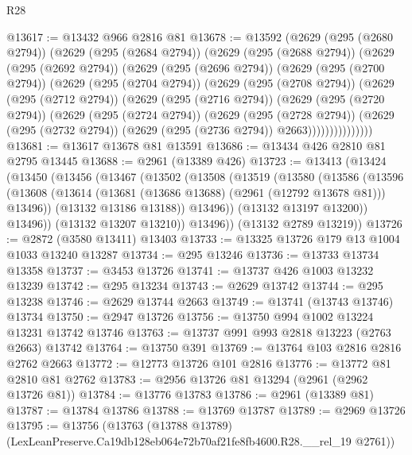 \begin{lexlean}{R28}
\begin{coremodule}
@13617 := @13432 @966 @2816 @81
@13678 := @13592
    (@2629
      (@295 (@2680 @2794))
      (@2629
        (@295 (@2684 @2794))
        (@2629
          (@295 (@2688 @2794))
          (@2629
            (@295 (@2692 @2794))
            (@2629
              (@295 (@2696 @2794))
              (@2629
                (@295 (@2700 @2794))
                (@2629
                  (@295 (@2704 @2794))
                  (@2629
                    (@295 (@2708 @2794))
                    (@2629
                      (@295 (@2712 @2794))
                      (@2629
                        (@295 (@2716 @2794))
                        (@2629
                          (@295 (@2720 @2794))
                          (@2629
                            (@295 (@2724 @2794))
                            (@2629
                              (@295 (@2728 @2794))
                              (@2629
                                (@295 (@2732 @2794))
                                (@2629 (@295 (@2736 @2794)) @2663)))))))))))))))
@13681 := @13617 @13678 @81 @13591
@13686 := @13434 @426 @2810 @81 @2795 @13445
@13688 := @2961 (@13389 @426)
@13723 := @13413
    (@13424
      (@13450
        (@13456
          (@13467
            (@13502
              (@13508
                (@13519
                  (@13580
                    (@13586
                      (@13596
                        (@13608
                          (@13614 (@13681 (@13686 @13688) (@2961 (@12792 @13678 @81))) @13496))
                        (@13132 @13186 @13188))
                      @13496))
                  (@13132 @13197 @13200))
                @13496))
            (@13132 @13207 @13210))
          @13496))
      (@13132 @2789 @13219))
@13726 := @2872 (@3580 @13411) @13403
@13733 := @13325 @13726 @179 @13 @1004 @1033 @13240 @13287
@13734 := @295 @13246
@13736 := @13733 @13734 @13358
@13737 := @3453 @13726
@13741 := @13737 @426 @1003 @13232 @13239
@13742 := @295 @13234
@13743 := @2629 @13742
@13744 := @295 @13238
@13746 := @2629 @13744 @2663
@13749 := @13741 (@13743 @13746) @13734
@13750 := @2947 @13726
@13756 := @13750 @994 @1002 @13224 @13231 @13742 @13746
@13763 := @13737 @991 @993 @2818 @13223 (@2763 @2663) @13742
@13764 := @13750 @391
@13769 := @13764 @103 @2816 @2816 @2762 @2663
@13772 := @12773 @13726 @101 @2816
@13776 := @13772 @81 @2810 @81 @2762
@13783 := @2956 @13726 @81 @13294 (@2961 (@2962 @13726 @81))
@13784 := @13776 @13783
@13786 := @2961 (@13389 @81)
@13787 := @13784 @13786
@13788 := @13769 @13787
@13789 := @2969 @13726
@13795 := @13756
    (@13763 (@13788 @13789) (LexLeanPreserve.Ca19db128eb064e72b70af21fe8fb4600.R28.__rel_19 @2761))

\end{coremodule}
\end{lexlean}

